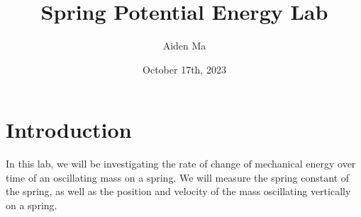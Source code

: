 \documentclass{article}
\title{Spring Potential Energy Lab}
\author{Aiden Ma}
\date{October 17th, 2023}
\begin{document}
    \maketitle
    
    \newpage
    
    \tableofcontents
    
    \newpage
    
    
    \section{Introduction}\label{sec:introduction}
        In this lab, we will be investigating the rate of change of mechanical energy over time of an oscillating mass on a spring.
        We will measure the spring constant of the spring, as well as the position and velocity of the mass oscillating vertically on a spring.
    
    
\end{document}
